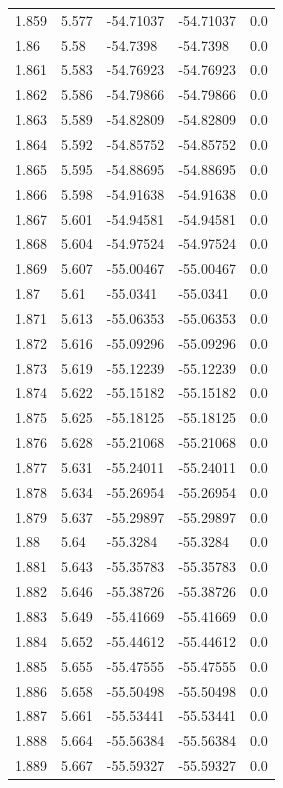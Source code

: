 \begin{tabular}{lllll}
1.859 & 5.577 & -54.71037 & -54.71037 & 0.0 \\
1.86 & 5.58 & -54.7398 & -54.7398 & 0.0 \\
1.861 & 5.583 & -54.76923 & -54.76923 & 0.0 \\
1.862 & 5.586 & -54.79866 & -54.79866 & 0.0 \\
1.863 & 5.589 & -54.82809 & -54.82809 & 0.0 \\
1.864 & 5.592 & -54.85752 & -54.85752 & 0.0 \\
1.865 & 5.595 & -54.88695 & -54.88695 & 0.0 \\
1.866 & 5.598 & -54.91638 & -54.91638 & 0.0 \\
1.867 & 5.601 & -54.94581 & -54.94581 & 0.0 \\
1.868 & 5.604 & -54.97524 & -54.97524 & 0.0 \\
1.869 & 5.607 & -55.00467 & -55.00467 & 0.0 \\
1.87 & 5.61 & -55.0341 & -55.0341 & 0.0 \\
1.871 & 5.613 & -55.06353 & -55.06353 & 0.0 \\
1.872 & 5.616 & -55.09296 & -55.09296 & 0.0 \\
1.873 & 5.619 & -55.12239 & -55.12239 & 0.0 \\
1.874 & 5.622 & -55.15182 & -55.15182 & 0.0 \\
1.875 & 5.625 & -55.18125 & -55.18125 & 0.0 \\
1.876 & 5.628 & -55.21068 & -55.21068 & 0.0 \\
1.877 & 5.631 & -55.24011 & -55.24011 & 0.0 \\
1.878 & 5.634 & -55.26954 & -55.26954 & 0.0 \\
1.879 & 5.637 & -55.29897 & -55.29897 & 0.0 \\
1.88 & 5.64 & -55.3284 & -55.3284 & 0.0 \\
1.881 & 5.643 & -55.35783 & -55.35783 & 0.0 \\
1.882 & 5.646 & -55.38726 & -55.38726 & 0.0 \\
1.883 & 5.649 & -55.41669 & -55.41669 & 0.0 \\
1.884 & 5.652 & -55.44612 & -55.44612 & 0.0 \\
1.885 & 5.655 & -55.47555 & -55.47555 & 0.0 \\
1.886 & 5.658 & -55.50498 & -55.50498 & 0.0 \\
1.887 & 5.661 & -55.53441 & -55.53441 & 0.0 \\
1.888 & 5.664 & -55.56384 & -55.56384 & 0.0 \\
1.889 & 5.667 & -55.59327 & -55.59327 & 0.0 \\

\end{tabular}
